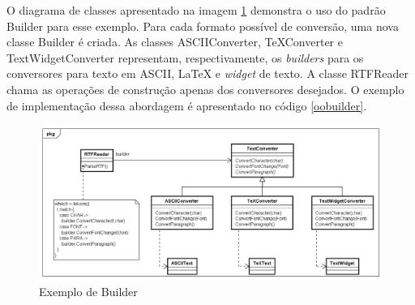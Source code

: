 O diagrama de classes apresentado na imagem 
\ref{builder_exemplo} demonstra o uso do padrão 
Builder para esse exemplo. Para cada formato possível 
de conversão, uma nova classe Builder é criada. 
As classes ASCIIConverter, TeXConverter e 
TextWidgetConverter representam, respectivamente, 
os \textit{builders} para os conversores para texto 
em ASCII, LaTeX e \textit{widget} de texto. A classe 
RTFReader chama as operações de construção 
apenas dos conversores desejados. O exemplo de 
implementação dessa abordagem é apresentado no 
código \ref{oobuilder}.

\begin{figure}[htb]
	\caption{\label{builder_exemplo}Exemplo de Builder}
	\begin{center}
	    \includegraphics[scale=0.5]{5_padroes-contexto-funcional/5.1_criacionais/5.1.3_builder/builder_exemplo.png}
	\end{center}
\end{figure}

